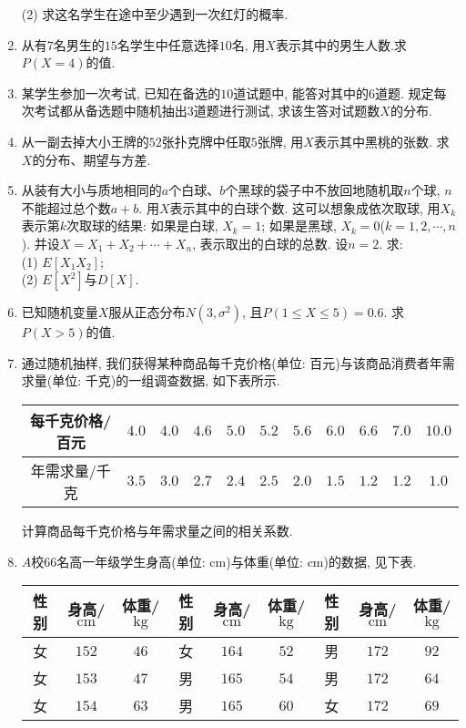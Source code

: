 \documentclass[10pt,a4paper]{article}
\begin{document}
\begin{enumerate}[1.]
(2) 求这名学生在途中至少遇到一次红灯的概率.
\item 从有$7$名男生的$15$名学生中任意选择$10$名, 用$X$表示其中的男生人数.求$P(X=4)$的值.
\item 某学生参加一次考试, 已知在备选的$10$道试题中, 能答对其中的$6$道题. 规定每次考试都从备选题中随机抽出$3$道题进行测试, 求该生答对试题数$X$的分布.
\item 从一副去掉大小王牌的$52$张扑克牌中任取$5$张牌, 用$X$表示其中黑桃的张数. 求$X$的分布、期望与方差.
\item 从装有大小与质地相同的$a$个白球、$b$个黑球的袋子中不放回地随机取$n$个球, $n$不能超过总个数$a+b$. 用$X$表示其中的白球个数. 这可以想象成依次取球, 用$X_k$表示第$k$次取球的结果: 如果是白球, $X_k=1$; 如果是黑球, $X_k=0$($k=1, 2, \cdots, n$). 并设$X=X_1+X_2+\cdots+X_n$, 表示取出的白球的总数. 设$n=2$. 求:\\
(1) $E[X_1X_2]$;\\
(2) $E[X^2]$与$D[X]$.
\item 已知随机变量$X$服从正态分布$N(3,\sigma^2)$, 且$P(1\le X\le 5)=0.6$. 求$P(X>5)$的值.
\item 通过随机抽样, 我们获得某种商品每千克价格(单位: 百元)与该商品消费者年需求量(单位: 千克)的一组调查数据, 如下表所示. 
\begin{center}
\begin{tabular}{|c|c|c|c|c|c|c|c|c|c|c|}
\hline
每千克价格/百元 & $4.0$ & $4.0$ & $4.6$ & $5.0$ & $5.2$ & $5.6$ & $6.0$ & $6.6$ & $7.0$ & $10.0$ \\ \hline
年需求量/千克 & $3.5$ & $3.0$ & $2.7$ & $2.4$ & $2.5$ & $2.0$ & $1.5$ & $1.2$ & $1.2$ & $1.0$ \\ \hline
\end{tabular}
\end{center}
计算商品每千克价格与年需求量之间的相关系数.
\item $A$校$66$名高一年级学生身高(单位: $\text{cm}$)与体重(单位: $\text{cm}$)的数据, 见下表. 
\begin{center}
\begin{longtable}{|c|c|c|c|c|c|c|c|c|}
\hline
性别 & 身高/$\text{cm}$  & 体重/$\text{kg}$ & 性别 & 身高/$\text{cm}$  & 体重/$\text{kg}$ & 性别 & 身高/$\text{cm}$  & 体重/$\text{kg}$ \\ \hline
\endhead
女 & $152$ & $46$ & 女 & $164$ & $52$ & 男 & $172$ & $92$ \\ \hline
女 & $153$ & $47$ & 男 & $165$ & $54$ & 男 & $172$ & $64$ \\ \hline
女 & $154$ & $63$ & 男 & $165$ & $60$ & 女 & $172$ & $69$ \\ \hline

\end{longtable}
\end{center}
\end{enumerate}
\end{document}
